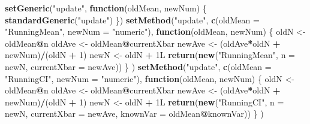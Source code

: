 \documentclass[12pt,krantz2]{krantz}
\makeatletter
\newenvironment{Shaded}{\begin{snugshade}}{\end{snugshade}}
\newcommand{\ControlFlowTok}[1]{\textcolor[rgb]{0.27,0.27,0.27}{\textbf{#1}}}
\newcommand{\DataTypeTok}[1]{\textcolor[rgb]{0.27,0.27,0.27}{#1}}
\newcommand{\DecValTok}[1]{\textcolor[rgb]{0.06,0.06,0.06}{#1}}
\newcommand{\KeywordTok}[1]{\textcolor[rgb]{0.27,0.27,0.27}{\textbf{#1}}}
\newcommand{\NormalTok}[1]{#1}
\newcommand{\OperatorTok}[1]{\textcolor[rgb]{0.43,0.43,0.43}{\textbf{#1}}}
\newcommand{\StringTok}[1]{\textcolor[rgb]{0.5,0.5,0.5}{#1}}
\newenvironment{kframe}{%
\medskip{}
\setlength{\fboxsep}{.8em}
 \def\at@end@of@kframe{}%
 \ifinner\ifhmode%
  \def\at@end@of@kframe{\end{minipage}}%
  \begin{minipage}{\columnwidth}%
 \fi\fi%
 \def\FrameCommand##1{\hskip\@totalleftmargin \hskip-\fboxsep
 \colorbox{shadecolor}{##1}\hskip-\fboxsep
     \hskip-\linewidth \hskip-\@totalleftmargin \hskip\columnwidth}%
 \MakeFramed {\advance\hsize-\width
   \@totalleftmargin\z@ \linewidth\hsize
   \@setminipage}}%
 {\par\unskip\endMakeFramed%
 \at@end@of@kframe}
\renewenvironment{Shaded}{\begin{kframe}}{\end{kframe}}
\makeatother
\begin{document}
\begin{Shaded}
\begin{Highlighting}[]
\KeywordTok{setGeneric}\NormalTok{(}\StringTok{"update"}\NormalTok{, }\ControlFlowTok{function}\NormalTok{(oldMean, newNum) \{}
  \KeywordTok{standardGeneric}\NormalTok{(}\StringTok{"update"}\NormalTok{)}
\NormalTok{\})}
\KeywordTok{setMethod}\NormalTok{(}\StringTok{"update"}\NormalTok{,}
          \KeywordTok{c}\NormalTok{(}\DataTypeTok{oldMean =} \StringTok{"RunningMean"}\NormalTok{, }\DataTypeTok{newNum =} \StringTok{"numeric"}\NormalTok{),}
          \ControlFlowTok{function}\NormalTok{(oldMean, newNum) \{}
\NormalTok{            oldN <-}\StringTok{ }\NormalTok{oldMean}\OperatorTok{@}\NormalTok{n}
\NormalTok{            oldAve <-}\StringTok{ }\NormalTok{oldMean}\OperatorTok{@}\NormalTok{currentXbar}
\NormalTok{            newAve <-}\StringTok{ }\NormalTok{(oldAve}\OperatorTok{*}\NormalTok{oldN }\OperatorTok{+}\StringTok{ }\NormalTok{newNum)}\OperatorTok{/}\NormalTok{(oldN }\OperatorTok{+}\StringTok{ }\DecValTok{1}\NormalTok{)}
\NormalTok{            newN <-}\StringTok{ }\NormalTok{oldN }\OperatorTok{+}\StringTok{ }\NormalTok{1L}
            \KeywordTok{return}\NormalTok{(}\KeywordTok{new}\NormalTok{(}\StringTok{"RunningMean"}\NormalTok{, }\DataTypeTok{n =}\NormalTok{ newN, }\DataTypeTok{currentXbar =}\NormalTok{ newAve))}
\NormalTok{          \}}
\NormalTok{)}
\KeywordTok{setMethod}\NormalTok{(}\StringTok{"update"}\NormalTok{,}
          \KeywordTok{c}\NormalTok{(}\DataTypeTok{oldMean =} \StringTok{"RunningCI"}\NormalTok{, }\DataTypeTok{newNum =} \StringTok{"numeric"}\NormalTok{),}
          \ControlFlowTok{function}\NormalTok{(oldMean, newNum) \{}
\NormalTok{            oldN <-}\StringTok{ }\NormalTok{oldMean}\OperatorTok{@}\NormalTok{n}
\NormalTok{            oldAve <-}\StringTok{ }\NormalTok{oldMean}\OperatorTok{@}\NormalTok{currentXbar}
\NormalTok{            newAve <-}\StringTok{ }\NormalTok{(oldAve}\OperatorTok{*}\NormalTok{oldN }\OperatorTok{+}\StringTok{ }\NormalTok{newNum)}\OperatorTok{/}\NormalTok{(oldN }\OperatorTok{+}\StringTok{ }\DecValTok{1}\NormalTok{)}
\NormalTok{            newN <-}\StringTok{ }\NormalTok{oldN }\OperatorTok{+}\StringTok{ }\NormalTok{1L}
            \KeywordTok{return}\NormalTok{(}\KeywordTok{new}\NormalTok{(}\StringTok{"RunningCI"}\NormalTok{, }\DataTypeTok{n =}\NormalTok{ newN, }\DataTypeTok{currentXbar =}\NormalTok{ newAve, }
                       \DataTypeTok{knownVar =}\NormalTok{ oldMean}\OperatorTok{@}\NormalTok{knownVar))}
\NormalTok{          \}}
\NormalTok{)}
\end{Highlighting}
\end{Shaded}
\end{document}

